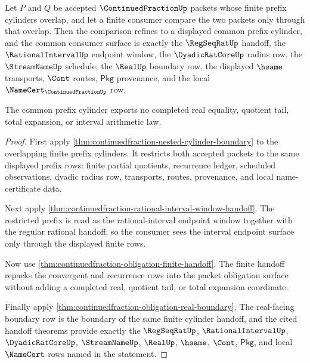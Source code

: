 \begin{theorem}
\label{thm:continuedfraction-common-refinement-cylinder-exhaustion}
Let $P$ and $Q$ be accepted $\ContinuedFractionUp$ packets whose finite prefix
cylinders overlap, and let a finite consumer compare the two packets only
through that overlap. Then the comparison refines to a displayed common prefix
cylinder, and the common consumer surface is exactly the $\RegSeqRatUp$
handoff, the $\RationalIntervalUp$ endpoint window, the $\DyadicRatCoreUp$
radius row, the $\StreamNameUp$ schedule, the $\RealUp$ boundary row, the
displayed $\hsame$ transports, $\Cont$ routes, $\mathsf{Pkg}$ provenance, and
the local $\NameCert_{\ContinuedFractionUp}$ row.

The common prefix cylinder exports no completed real equality, quotient tail,
total expansion, or interval arithmetic law.
\end{theorem}
\begin{proof}
First apply \autoref{thm:continuedfraction-nested-cylinder-boundary} to the
overlapping finite prefix cylinders. It restricts both accepted packets to the
same displayed prefix rows: finite partial quotients, recurrence ledger,
scheduled observations, dyadic radius row, transports, routes, provenance, and
local name-certificate data.

Next apply
\autoref{thm:continuedfraction-rational-interval-window-handoff}. The
restricted prefix is read as the rational-interval endpoint window together
with the regular rational handoff, so the consumer sees the interval endpoint
surface only through the displayed finite rows.

Now use \autoref{thm:continuedfraction-obligation-finite-handoff}. The finite
handoff repacks the convergent and recurrence rows into the packet obligation
surface without adding a completed real, quotient tail, or total expansion
coordinate.

Finally apply \autoref{thm:continuedfraction-obligation-real-boundary}. The
real-facing boundary row is the boundary of the same finite cylinder handoff,
and the cited handoff theorems provide exactly the $\RegSeqRatUp$,
$\RationalIntervalUp$, $\DyadicRatCoreUp$, $\StreamNameUp$, $\RealUp$,
$\hsame$, $\Cont$, $\mathsf{Pkg}$, and local $\NameCert$ rows named in the
statement.
\end{proof}

